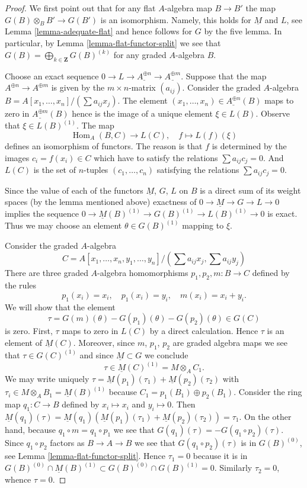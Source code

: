 \documentclass{stacks-project}
\theoremstyle{plain}
\theoremstyle{definition}
\theoremstyle{remark}
\numberwithin{equation}{subsection}
\def\Hom{\mathop{\mathrm{Hom}}\nolimits}
\begin{document}
\begin{proof}
We first point out that for any flat $A$-algebra map
$B \to B'$ the map $G(B) \otimes_B B' \to G(B')$ is an isomorphism.
Namely, this holds for $\underline{M}$ and $L$, see
Lemma \ref{lemma-adequate-flat}
and hence follows for $G$ by the five lemma. In particular, by
Lemma \ref{lemma-flat-functor-split}
we see that $G(B) = \bigoplus_{k \in \mathbf{Z}} G(B)^{(k)}$
for any graded $A$-algebra $B$.

\medskip\noindent
Choose an exact sequence
$0 \to L \to \underline{A^{\oplus n}} \to \underline{A^{\oplus m}}$.
Suppose that the map $A^{\oplus n} \to A^{\oplus m}$ is given by the
$m \times n$-matrix $(a_{ij})$. Consider the graded $A$-algebra
$B = A[x_1, \ldots, x_n]/(\sum a_{ij}x_j)$. The element
$(x_1, \ldots, x_n) \in \underline{A^{\oplus n}}(B)$ maps to zero in
$\underline{A^{\oplus m}}(B)$ hence is the image of a unique element
$\xi \in L(B)$. Observe that $\xi \in L(B)^{(1)}$. The map
$$
\Hom_A(B, C) \longrightarrow L(C), \quad
f \longmapsto L(f)(\xi)
$$
defines an isomorphism of functors. The reason is that $f$ is
determined by the images $c_i = f(x_i) \in C$ which have to
satisfy the relations $\sum a_{ij}c_j = 0$. And $L(C)$ is the
set of $n$-tuples $(c_1, \ldots, c_n)$ satisfying the relations
$\sum a_{ij} c_j = 0$.

\medskip\noindent
Since the value of each of the functors $\underline{M}$, $G$, $L$
on $B$ is a direct sum of its weight spaces (by the lemma mentioned
above) exactness of $0 \to \underline{M} \to G \to L \to 0$ implies
the sequence $0 \to \underline{M}(B)^{(1)} \to G(B)^{(1)} \to L(B)^{(1)} \to 0$
is exact. Thus we may choose an element $\theta \in G(B)^{(1)}$ mapping
to $\xi$.

\medskip\noindent
Consider the graded $A$-algebra
$$
C = A[x_1, \ldots, x_n, y_1, \ldots, y_n]/
(\sum a_{ij}x_j, \sum a_{ij}y_j)
$$
There are three graded $A$-algebra homomorphisms $p_1, p_2, m : B \to C$
defined by the rules
$$
p_1(x_i) = x_i, \quad
p_1(x_i) = y_i, \quad
m(x_i) = x_i + y_i.
$$
We will show that the element
$$
\tau = G(m)(\theta) - G(p_1)(\theta) - G(p_2)(\theta) \in G(C)
$$
is zero. First, $\tau$ maps to zero in $L(C)$ by a direct calculation.
Hence $\tau$ is an element of $\underline{M}(C)$.
Moreover, since $m$, $p_1$, $p_2$ are graded algebra maps we see
that $\tau \in G(C)^{(1)}$ and since $\underline{M} \subset G$
we conclude
$$
\tau \in \underline{M}(C)^{(1)} = M \otimes_A C_1.
$$
We may write uniquely
$\tau = \underline{M}(p_1)(\tau_1) + \underline{M}(p_2)(\tau_2)$ with
$\tau_i \in M \otimes_A B_1 = \underline{M}(B)^{(1)}$ because
$C_1 = p_1(B_1) \oplus p_2(B_1)$.
Consider the ring map $q_1 : C \to B$ defined by $x_i \mapsto x_i$ and
$y_i \mapsto 0$. Then
$\underline{M}(q_1)(\tau) =
\underline{M}(q_1)(\underline{M}(p_1)(\tau_1) + \underline{M}(p_2)(\tau_2)) =
\tau_1$.
On the other hand, because
$q_1 \circ m = q_1 \circ p_1$ we see that
$G(q_1)(\tau) = - G(q_1 \circ p_2)(\tau)$. Since $q_1 \circ p_2$ factors as
$B \to A \to B$ we see that $G(q_1 \circ p_2)(\tau)$ is in
$G(B)^{(0)}$, see
Lemma \ref{lemma-flat-functor-split}.
Hence $\tau_1 = 0$ because it is in
$G(B)^{(0)} \cap \underline{M}(B)^{(1)} \subset
G(B)^{(0)} \cap G(B)^{(1)} = 0$.
Similarly $\tau_2 = 0$, whence $\tau = 0$.


\end{proof}
\end{document}
